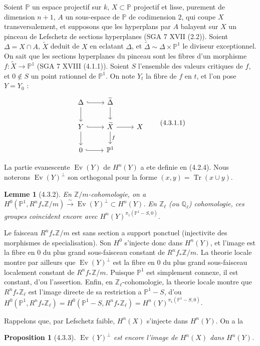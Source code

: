 \documentclass[12pt,a4paper]{article}
\theoremstyle{plain}
\newtheorem{lemma}[theorem]{Lemme}
\newtheorem{proposition}[theorem]{Proposition}
\theoremstyle{definition}
\theoremstyle{remark}
\DeclareMathOperator{\Tr}{Tr}
\DeclareMathOperator{\Ev}{Ev}
\newcommand{\bbZ}{\mathbb{Z}}
\newcommand{\bbP}{\mathbb{P}}
\newcommand{\Zl}{\mathbb{Z}_\ell}
\newcommand{\Ql}{\mathbb{Q}_\ell}
\begin{document}
Soient $\bbP$ un espace projectif sur $k$, $X \subset \bbP$ projectif et lisse, purement de dimension $n+1$, $A$ un sous-espace de $\bbP$ de codimension $2$, qui coupe $X$ transversalement, et supposons que les hyperplans par $A$ balayent sur $X$ un pinceau de Lefschetz de sections hyperplanes (SGA 7 XVII (2.2)). Soient $\Delta = X \cap A$, $\widetilde{X}$ deduit de $X$ en eclatant $\Delta$, et $\widetilde{\Delta} \sim \Delta \times \bbP^1$ le diviseur exceptionnel. On sait que les sections hyperplanes du pinceau sont les fibres d'un morphisme $f : \widetilde{X} \to \bbP^1$ (SGA 7 XVIII (4.1.1)). Soient $S$ l'ensemble des valeurs critiques de $f$, et $0 \notin S$ un point rationnel de $\bbP^1$. On note $Y_t$ la fibre de $f$ en $t$, et l'on pose $Y = Y_0$ :
\[
\begin{tikzcd}
\Delta \arrow[r, hook] \arrow[d] & \widetilde{\Delta} \arrow[d] \\
Y \arrow[r, hook] \arrow[d] & \widetilde{X} \arrow[r] \arrow[d, "f"] & X \\
0 \arrow[r, hook] & \bbP^1
\end{tikzcd}
\tag{4.3.1.1}
\]

La partie evanescente $\Ev(Y)$ de $H^n(Y)$ a ete definie en (4.2.4). Nous noterons $\Ev(Y)^\perp$ son orthogonal pour la forme $(x, y) = \Tr(x \cup y)$.

\begin{lemma}[4.3.2]
En $\bbZ/m$-cohomologie, on a $H^0(\bbP^1, R^n f_* \bbZ/m) \xrightarrow{\sim} \Ev(Y)^\perp \subset H^n(Y)$. En $\Zl$ (ou $\Ql$) cohomologie, ces groupes coincident encore avec $H^n(Y)^{\pi_1(\bbP^1 - S, 0)}$.
\end{lemma}

Le faisceau $R^n f_* \bbZ/m$ est sans section a support ponctuel (injectivite des morphismes de specialisation). Son $H^0$ s'injecte donc dans $H^n(Y)$, et l'image est la fibre en $0$ du plus grand sous-faisceau constant de $R^n f_* \bbZ/m$. La theorie locale montre par ailleurs que $\Ev(Y)^\perp$ est la fibre en $0$ du plus grand sous-faisceau localement constant de $R^n f_* \bbZ/m$. Puisque $\bbP^1$ est simplement connexe, il est constant, d'ou l'assertion. Enfin, en $\Zl$-cohomologie, la theorie locale montre que $R^n f_* \Zl$ est l'image directe de sa restriction a $\bbP^1 - S$, d'ou $H^0(\bbP^1, R^n f_* \Zl) = H^0(\bbP^1 - S, R^n f_* \Zl) = H^n(Y)^{\pi_1(\bbP^1 - S, 0)}$.

Rappelons que, par Lefschetz faible, $H^n(X)$ s'injecte dans $H^n(Y)$. On a la

\begin{proposition}[4.3.3]
$\Ev(Y)^\perp$ est encore l'image de $H^n(X)$ dans $H^n(Y)$.
\end{proposition}
\end{document}

